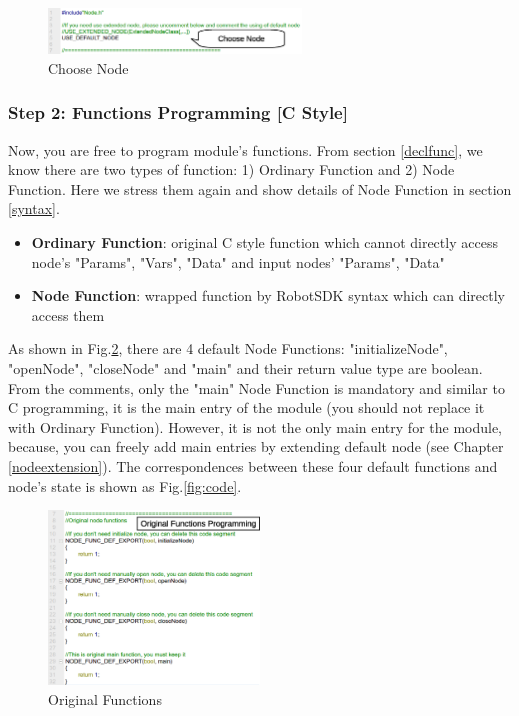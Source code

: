 \documentclass[a4paper,10pt]{book}
\begin{document}
\begin{figure}
 \centering
 \includegraphics[width=0.6\textwidth]{img/source1.eps}
 \caption{Choose Node}
 \label{fig:source1}
\end{figure}

\subsubsection{Step 2: Functions Programming [C Style]}

Now, you are free to program module's functions. From section \ref{declfunc}, we know there are two types of function: 1) Ordinary Function and 2) Node Function. Here we stress them again and show details of Node Function in section \ref{syntax}.

\begin{framed}
 \begin{itemize}
  \item {\bf{Ordinary Function}}: original C style function which cannot directly access node's "Params", "Vars", "Data" and input nodes' "Params", "Data"
  \item {\bf{Node Function}}: wrapped function by RobotSDK syntax which can directly access them
 \end{itemize}
\end{framed}

As shown in Fig.\ref{fig:source2}, there are 4 default Node Functions: "initializeNode", "openNode", "closeNode" and "main" and their return value type are boolean. From the comments, only the "main" Node Function is mandatory and similar to C programming, it is the main entry of the module (you should not replace it with Ordinary Function). However, it is not the only main entry for the module, because, you can freely add main entries by extending default node (see Chapter \ref{nodeextension}). The correspondences between these four default functions and node's state is shown as Fig.\ref{fig:code}.

\begin{figure}
 \centering
 \includegraphics[width=0.5\textwidth]{img/source2.eps}
 \caption{Original Functions}
 \label{fig:source2}
\end{figure}
\end{document}

